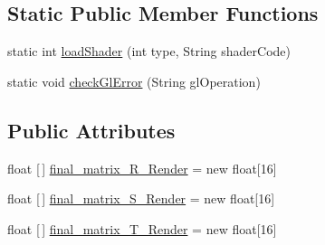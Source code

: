 \subsection*{Static Public Member Functions}
\begin{DoxyCompactItemize}
\item 
static int \hyperlink{classandroid_1_1app_1_1printerapp_1_1viewer_1_1_viewer_renderer_ae50d5a637643e941fca8d7be4cda890e}{load\+Shader} (int type, String shader\+Code)
\item 
static void \hyperlink{classandroid_1_1app_1_1printerapp_1_1viewer_1_1_viewer_renderer_a504fd4ca6807307b5ffe482a4913ca85}{check\+Gl\+Error} (String gl\+Operation)
\end{DoxyCompactItemize}
\subsection*{Public Attributes}
\begin{DoxyCompactItemize}
\item 
float \mbox{[}$\,$\mbox{]} \hyperlink{classandroid_1_1app_1_1printerapp_1_1viewer_1_1_viewer_renderer_a6b50e6bcd17892527cbb1830427d4573}{final\+\_\+matrix\+\_\+\+R\+\_\+\+Render} = new float\mbox{[}16\mbox{]}
\item 
float \mbox{[}$\,$\mbox{]} \hyperlink{classandroid_1_1app_1_1printerapp_1_1viewer_1_1_viewer_renderer_aafcc33ddf4959fcf706bf4c6fad60baf}{final\+\_\+matrix\+\_\+\+S\+\_\+\+Render} = new float\mbox{[}16\mbox{]}
\item 
float \mbox{[}$\,$\mbox{]} \hyperlink{classandroid_1_1app_1_1printerapp_1_1viewer_1_1_viewer_renderer_aa38009ff841bcdeb594f3689db0c2817}{final\+\_\+matrix\+\_\+\+T\+\_\+\+Render} = new float\mbox{[}16\mbox{]}
\end{DoxyCompactItemize}

